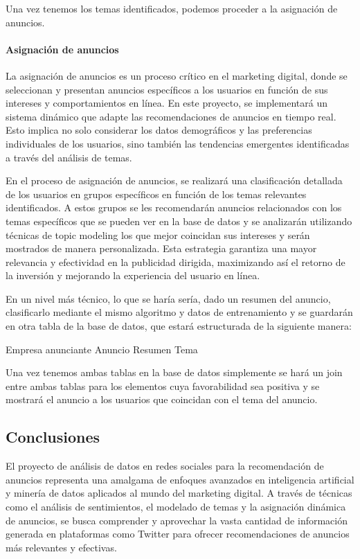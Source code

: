 \documentclass[
  letterpaper,
  DIV=11,
  numbers=noendperiod]{scrartcl}
\let\oldparagraph\paragraph
\renewcommand{\paragraph}[1]{\oldparagraph{#1}\mbox{}}
\begin{document}
Una vez tenemos los temas identificados, podemos proceder a la
asignación de anuncios.

\paragraph{Asignación de anuncios}\label{asignaciuxf3n-de-anuncios}

La asignación de anuncios es un proceso crítico en el marketing digital,
donde se seleccionan y presentan anuncios específicos a los usuarios en
función de sus intereses y comportamientos en línea. En este proyecto,
se implementará un sistema dinámico que adapte las recomendaciones de
anuncios en tiempo real. Esto implica no solo considerar los datos
demográficos y las preferencias individuales de los usuarios, sino
también las tendencias emergentes identificadas a través del análisis de
temas.

En el proceso de asignación de anuncios, se realizará una clasificación
detallada de los usuarios en grupos específicos en función de los temas
relevantes identificados. A estos grupos se les recomendarán anuncios
relacionados con los temas específicos que se pueden ver en la base de
datos y se analizarán utilizando técnicas de topic modeling los que
mejor coincidan sus intereses y serán mostrados de manera personalizada.
Esta estrategia garantiza una mayor relevancia y efectividad en la
publicidad dirigida, maximizando así el retorno de la inversión y
mejorando la experiencia del usuario en línea.

En un nivel más técnico, lo que se haría sería, dado un resumen del
anuncio, clasificarlo mediante el mismo algoritmo y datos de
entrenamiento y se guardarán en otra tabla de la base de datos, que
estará estructurada de la siguiente manera:

Empresa anunciante \textbar{} Anuncio \textbar{} Resumen \textbar{} Tema
\textbar{}

Una vez tenemos ambas tablas en la base de datos simplemente se hará un
join entre ambas tablas para los elementos cuya favorabilidad sea
positiva y se mostrará el anuncio a los usuarios que coincidan con el
tema del anuncio.

\subsection{Conclusiones}\label{conclusiones}

El proyecto de análisis de datos en redes sociales para la recomendación
de anuncios representa una amalgama de enfoques avanzados en
inteligencia artificial y minería de datos aplicados al mundo del
marketing digital. A través de técnicas como el análisis de
sentimientos, el modelado de temas y la asignación dinámica de anuncios,
se busca comprender y aprovechar la vasta cantidad de información
generada en plataformas como Twitter para ofrecer recomendaciones de
anuncios más relevantes y efectivas.
\end{document}
